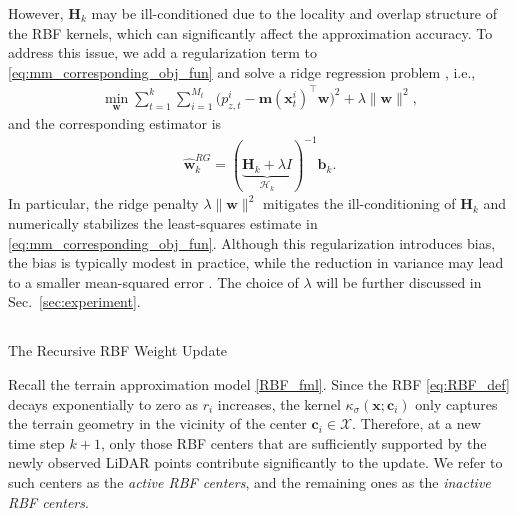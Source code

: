 \documentclass[journal,twoside,web]{ieeecolor}
\makeatletter
\let\origsubsection\subsection
\def\subsection{\@ifstar\subsectionstarcolor\subsectioncolorcmd}
\def\subsectioncolorcmd#1{\origsubsection{\textcolor{subsectioncolor}{#1}}}
\def\subsectionstarcolor#1{\origsubsection*{#1}}
\makeatother
\begin{document}
However, $\mathbf{H}_k$ may be ill-conditioned due to the locality and overlap structure of the RBF kernels, which can significantly affect the approximation accuracy. To address this issue, we add a regularization term to \eqref{eq:mm_corresponding_obj_fun} and solve a ridge regression problem \cite{ridge}, i.e.,
\begin{align}
\min_{\mathbf{w}} \sum_{t=1}^k\sum_{i=1}^{M_t}\bigl(p_{z,t}^i-\mathbf{m}(\mathbf{x}_t^i)^\top \mathbf{w}\bigr)^2 + \lambda \|\mathbf{w}\|^2,
\end{align}
and the corresponding estimator is
\begin{align}
    \hat{\mathbf{w}}^{RG}_k=(\underbrace{\mathbf{H}_k+\lambda I}_{\bm{\mathcal{H}}_k})^{-1}\mathbf{b}_k.
\end{align}
In particular, the ridge penalty $\lambda \|\mathbf{w}\|^2$ mitigates the ill-conditioning of $\mathbf{H}_k$ and numerically stabilizes the least-squares estimate in \eqref{eq:mm_corresponding_obj_fun}. Although this regularization introduces bias, the bias is typically modest in practice, while the reduction in variance may lead to a smaller mean-squared error \cite{ridge}. The choice of $\lambda$ will be further discussed in Sec.~\ref{sec:experiment}.

\subsection{The Recursive RBF Weight Update}\label{recur_RBF}

Recall the terrain approximation model \eqref{RBF_fml}. Since the RBF \eqref{eq:RBF_def} decays exponentially to zero as $r_i$ increases, the kernel $\kappa_\sigma(\mathbf{x};\mathbf{c}_i)$ only captures the terrain geometry in the vicinity of the center $\mathbf{c}_i\in\mathcal{X}$. Therefore, at a new time step $k+1$, only those RBF centers that are sufficiently supported by the newly observed LiDAR points contribute significantly to the update. We refer to such centers as the \emph{active RBF centers}, and the remaining ones as the \emph{inactive RBF centers}.
\end{document}
